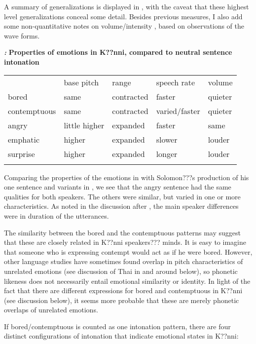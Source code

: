\documentclass[output=paper]{langsci/langscibook}
\begin{document}
A summary of generalizations is displayed in , with the caveat that these highest level generalizations conceal some detail. Besides previous measures, I also add some non-quantitative notes on volume/intensity , based on observations of the wave forms. 

\emph{\textbf{\textup{:}}}\textbf{ Properties of emotions in K??nni, compared to neutral sentence intonation }

\begin{tabular}{lllll} & base pitch & range & speech rate & volume\\
\lsptoprule
bored & same & contracted & faster & quieter\\
contemptuous & same & contracted & varied/faster & quieter\\
angry & little higher & expanded & faster & same\\
emphatic & higher & expanded & slower & louder\\
surprise & higher & expanded & longer & louder\\
\lspbottomrule
\end{tabular}
Comparing the properties of the emotions in  with Solomon???s production of his one sentence and variants in , we see that the angry sentence had the same qualities for both speakers. The others were similar, but varied in one or more characteristics. As noted in the discussion after , the main speaker differences were in duration of the utterances.

The similarity between the bored and the contemptuous patterns may suggest that these are closely related in K??nni speakers??? minds. It is easy to imagine that someone who is expressing contempt would act as if he were bored. However, other language studies have sometimes found overlap in pitch characteristics of unrelated emotions (see discussion of Thai in and around  below), so phonetic likeness does not necessarily entail emotional similarity or identity. In light of the fact that there are different expressions for bored and contemptuous in K??nni (see discussion below), it seems more probable that these are merely phonetic overlaps of unrelated emotions.

If bored/contemptuous is counted as one intonation pattern, there are four distinct configurations of intonation that indicate emotional states in K??nni:
\end{document}
